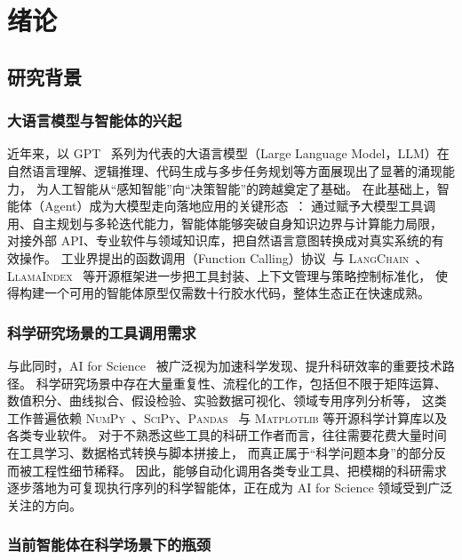 \clearpage

\section{绪论}

\subsection{研究背景}

\subsubsection{大语言模型与智能体的兴起}

近年来，以 \textsc{GPT}~\cite{brown2020gpt3,openai2023gpt4} 系列为代表的大语言模型（Large Language Model，LLM）在自然语言理解、逻辑推理、代码生成与多步任务规划等方面展现出了显著的涌现能力，
为人工智能从“感知智能”向“决策智能”的跨越奠定了基础。
在此基础上，智能体（Agent）成为大模型走向落地应用的关键形态~\cite{yao2023react,qin2023toollearning}：
通过赋予大模型工具调用、自主规划与多轮迭代能力，智能体能够突破自身知识边界与计算能力局限，
对接外部 \textsc{API}、专业软件与领域知识库，把自然语言意图转换成对真实系统的有效操作。
工业界提出的函数调用（Function Calling）协议~\cite{openai2023gpt4}与 \textsc{LangChain}~\cite{langchain2023}、\textsc{LlamaIndex}~\cite{llamaindex2023} 等开源框架进一步把工具封装、上下文管理与策略控制标准化，
使得构建一个可用的智能体原型仅需数十行胶水代码，整体生态正在快速成熟。

\subsubsection{科学研究场景的工具调用需求}

与此同时，AI for Science~\cite{jumper2021alphafold,butler2018ml4mat} 被广泛视为加速科学发现、提升科研效率的重要技术路径。
科学研究场景中存在大量重复性、流程化的工作，包括但不限于矩阵运算、数值积分、曲线拟合、假设检验、实验数据可视化、领域专用序列分析等，
这类工作普遍依赖 \textsc{NumPy}~\cite{harris2020numpy}、\textsc{SciPy}、\textsc{Pandas}~\cite{mckinney2010pandas} 与 \textsc{Matplotlib} 等开源科学计算库以及各类专业软件。
对于不熟悉这些工具的科研工作者而言，往往需要花费大量时间在工具学习、数据格式转换与脚本拼接上，
而真正属于“科学问题本身”的部分反而被工程性细节稀释。
因此，能够自动化调用各类专业工具、把模糊的科研需求逐步落地为可复现执行序列的科学智能体，正在成为 AI for Science 领域受到广泛关注的方向。

\subsubsection{当前智能体在科学场景下的瓶颈}

